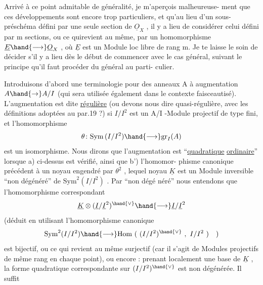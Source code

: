 
Arrivé à ce point admitable de généralité, je m'aperçois malheureuse-%
ment que ces développements sont encore trop particuliers, et qu'au lieu
d'un sous-préschéma défini par une seule section de $\underline{O}_X$ , il y a lieu de
considérer celui défini par m sections, ou ce qui\hand{/}revient au même, par un
homomorphisme $\underline{E} \hand{\longrightarrow} \underline{O}_X$ , où $\underline{E}$ est un Module loc libre de rang m. Je te
laisse le soin de décider s'il y a lieu dès le début de commencer avec le
cas général, suivant le principe qu'il faut procéder du général au parti-%
culier.

Introduisons d'abord une terminologie pour des anneaux A à
augmentation $A \hand{\to} A/I$ (qui sera utilisée également dans le contexte
faisceautisé). L'augmentation est dite \uline{régulière} (ou devons nous dire
quasi-régulière, avec les définitions adoptées au par.19 ?) si  $I/I^2$ est
un A/I -Module projectif de type fini, et  l'homomorphisme
\[ \theta\colon \mathrm{Sym}\,(I/I^2) \hand{\longrightarrow} \mathrm{gr}_I(A) \]
est un isomorphisme. Nous dirons que l'augmentation est  ``\uline{quadratique}
\uline{ordinaire}'' lorsque a) ci-dessus est vérifié, ainsi que b') l'homomor-%
phisme canonique précédent à un noyau engendré par $\theta^2$ , lequel noyau $\underline{K}$
est un Module inversible ``non dégénéré'' de $\mathrm{Sym}^2(I/I^2)$ . Par ``non dégé%
néré'' nous entendons que l'homomorphisme correspondant
\[ \underline{K} \otimes (\underline{I}/\underline{I}^2)^{\hand{\vee}} \hand{\longrightarrow} \underline{I}/\underline{I}^2 \]
(déduit en utilisant l'homomorphisme canonique
\[ \mathrm{Sym}^2(I/I^2) \hand{\longrightarrow} \mathrm{Hom}\ (\ (I/I^2)^{\hand{\vee}}\ ,\ I/I^2\ )\quad ) \]
est bijectif, ou ce qui revient au même surjectif (car il s'agit de
Modules projectifs  de même rang en chaque point), ou encore : prenant
localement une base  de $\underline{K}$ ,  la forme
quadratique correspondante sur $(I/I^2)^{\hand{\vee}}$ est non dégénérée. Il suffit

